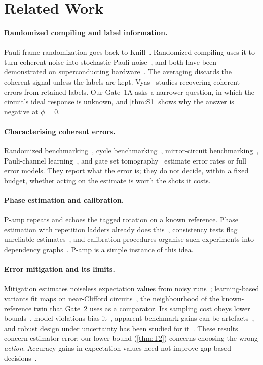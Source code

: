 \documentclass[10pt,twocolumn]{article}
\theoremstyle{definition}
\theoremstyle{remark}
\begin{document}
\section{Related Work}\label{sec:related}

\paragraph{Randomized compiling and label information.} Pauli-frame randomization goes back to Knill~\cite{knill2005}. Randomized compiling uses it to turn coherent noise into stochastic Pauli noise~\cite{wallman2016}, and both have been demonstrated on superconducting hardware~\cite{ware2021pfr,hashim2021}. The averaging discards the coherent signal unless the labels are kept. Vyas~\cite{vyas2026} studies recovering coherent errors from retained labels. Our Gate~1A asks a narrower question, in which the circuit's ideal response is unknown, and \cref{thm:S1} shows why the answer is negative at $\phi=0$.

\paragraph{Characterising coherent errors.} Randomized benchmarking~\cite{magesan2011}, cycle benchmarking~\cite{erhard2019}, mirror-circuit benchmarking~\cite{proctor2022mirror}, Pauli-channel learning~\cite{flammia2020pauli,chen2023learnability}, and gate set tomography~\cite{nielsen2021gst} estimate error rates or full error models. They report what the error is; they do not decide, within a fixed budget, whether acting on the estimate is worth the shots it costs.

\paragraph{Phase estimation and calibration.} P-amp repeats and echoes the tagged rotation on a known reference. Phase estimation with repetition ladders already does this~\cite{higgins2009,kimmel2015rpe,rudinger2017rpe}, consistency tests flag unreliable estimates~\cite{russo2021rpe}, and calibration procedures organise such experiments into dependency graphs~\cite{kelly2018dag}. P-amp is a simple instance of this idea.

\paragraph{Error mitigation and its limits.} Mitigation estimates noiseless expectation values from noisy runs~\cite{temme2017,kandala2019,cai2023}; learning-based variants fit maps on near-Clifford circuits~\cite{czarnik2021,lowe2021}, the neighbourhood of the known-reference twin that Gate~2 uses as a comparator. Its sampling cost obeys lower bounds~\cite{takagi2022,takagi2023,tsubouchi2023,quek2024}, model violations bias it~\cite{govia2025}, apparent benchmark gains can be artefacts~\cite{koster2026}, and robust design under uncertainty has been studied for it~\cite{prodius2026}. These results concern estimator error; our lower bound (\cref{thm:T2}) concerns choosing the wrong \emph{action}. Accuracy gains in expectation values need not improve gap-based decisions~\cite{scavino2026}.
\end{document}
